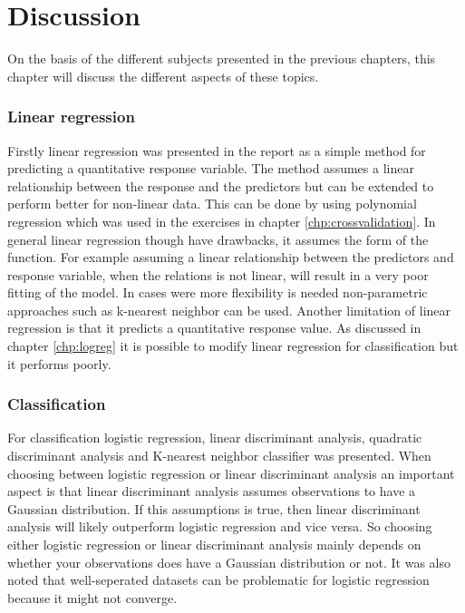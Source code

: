 \chapter{Discussion}
\label{chp:disc}
On the basis of the different subjects presented in the previous chapters, this chapter will discuss the different aspects of these  topics.

\subsection{Linear regression}

Firstly linear regression was presented in the report as a simple method for predicting a quantitative response variable. The method assumes a linear relationship between the response and the predictors but can be extended to perform better for non-linear data. This can be done by using polynomial regression which was used in the exercises in chapter \ref{chp:crossvalidation}. In general linear regression though have drawbacks, it assumes the form of the function. For example assuming a linear relationship between the predictors and response variable, when the relations is not linear, will result in a very poor fitting of the model. In cases were more flexibility is needed non-parametric approaches such as k-nearest neighbor can be used. Another limitation of linear regression is that it predicts a quantitative response value. As discussed in chapter \ref{chp:logreg} it is possible to modify linear regression for classification but it performs poorly.

\subsection{Classification}

For classification logistic regression, linear discriminant analysis, quadratic discriminant analysis and K-nearest neighbor classifier was presented. When choosing between logistic regression or linear discriminant analysis an important aspect is that linear discriminant analysis assumes observations to have a Gaussian distribution. If this assumptions is true, then linear discriminant analysis will likely outperform logistic regression and vice versa. So choosing either logistic regression or linear discriminant analysis mainly depends on whether your observations does have a Gaussian distribution or not. It was also noted that well-seperated datasets can be problematic for logistic regression because it might not converge.
 
